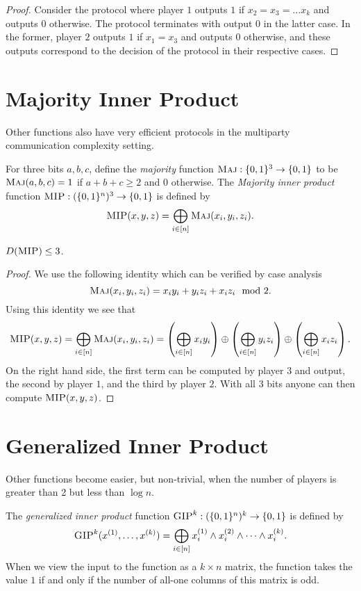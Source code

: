 \begin{proof}
Consider the protocol where player $1$ outputs $1$ if $x_2 = x_3 = \dots x_k$ and outputs $0$ otherwise. The protocol terminates with output $0$ in the latter case. In the former, player $2$ outputs $1$ if $x_1 = x_3$ and outputs $0$ otherwise, and these outputs correspond to the decision of the protocol in their respective cases.
\end{proof}



\newpage 
\section{Majority Inner Product}

Other functions also have very efficient protocols in the multiparty communication complexity setting. 

For three bits $a,b,c$, define the \emph{majority} function $\textsc{Maj} : \{0,1\}^3 \to \{0,1\}$ to be $\textsc{Maj}(a,b,c) = 1$ if $a+b+c \ge 2$ and $0$ otherwise. The \emph{Majority inner product} function $\textsc{MIP} : (\{0,1\}^n)^3 \to \{0,1\}$ is defined by
\[
\textsc{MIP}(x,y,z) = \bigoplus_{i \in [n]} \textsc{Maj}(x_i,y_i,z_i).
\]
\begin{theorem}
$D(\textsc{MIP}) \le 3$.
\end{theorem}

\begin{proof}
We use the following identity which can be verified by case analysis
$$\textsc{Maj}(x_i,y_i,z_i) = x_iy_i + y_iz_i + x_iz_i \mod 2.$$
Using this identity we see that
$$\textsc{MIP}(x,y,z) = \bigoplus_{i\in[n]}\textsc{Maj}(x_i,y_i,z_i) = \left(\bigoplus_{i\in [n]} x_iy_i\right)\oplus\left(\bigoplus_{i\in [n]} y_iz_i\right)\oplus\left(\bigoplus_{i\in [n]} x_iz_i\right).$$
On the right hand side, the first term can be computed by player $3$ and output, the second by player $1$, and the third by player $2$. With all $3$ bits anyone can then compute $\textsc{MIP}(x,y,z)$.
\end{proof}


\newpage 
\section{Generalized Inner Product}

Other functions become easier, but non-trivial, when the number of players is greater than 2 but less than $\log n$.

The \emph{generalized inner product} function $\textsc{GIP}^k : (\{0,1\}^n)^k \to \{0,1\}$ is defined by
\[
\textsc{GIP}^k(x^{(1)},\ldots,x^{(k)}) = \bigoplus_{i \in [n]} x^{(1)}_i \wedge x^{(2)}_i \wedge \cdots \wedge x^{(k)}_i.
\]
When we view the input to the function as a $k \times n$ matrix, the function takes the value $1$ if and only if the number of all-one columns of this matrix is odd. 


